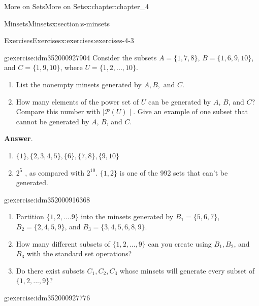 \documentclass[oneside,10pt,]{book}
\newcommand{\blocktitlefont}{\relax}
\begin{document}
\begin{chapterptx}{More on Sets}{}{More on Sets}{}{}{x:chapter:chapter_4}
\begin{sectionptx}{Minsets}{}{Minsets}{}{}{x:section:s-minsets}
%
%
\typeout{************************************************}
\typeout{************************************************}
%
\begin{exercises-subsection}{Exercises}{}{Exercises}{}{}{x:exercises:exercises-4-3}
\begin{divisionexercise}{1}{}{}{g:exercise:idm352000927904}%
Consider the subsets \(A = \{1, 7, 8\}\), \(B = \{1, 6, 9, 10\}\), and \(C = \{1, 9, 10\}\), where \(U = \{1,2, . . . , 10\}\).%
\par
%
\begin{enumerate}[label=(\alph*)]
\item{}List the nonempty minsets generated by \(A, B, \textrm{ and } C\).%
\item{}How many elements of the power set of \(U\) can be generated by \(A\), \(B\), and \(C\)? Compare this number with \(\mid\mathcal{P}(U)\mid\).  Give an example of one subset that cannot be generated by \(A\), \(B\), and \(C\).%
\end{enumerate}
%
\par\smallskip%
\noindent\textbf{\blocktitlefont Answer}.\hypertarget{g:answer:idm352000927536}{}\quad{}%
\begin{enumerate}[label=(\alph*)]
\item{}\(\displaystyle \{1\}, \{2, 3, 4, 5\}, \{6\}, \{7, 8\}, \{9, 10\}\)%
\item{}\(2^5\) , as compared with \(2^{10}\).   \(\{1, 2\}\) is one of the 992 sets that can't be generated.%
\end{enumerate}
%
\end{divisionexercise}%
\begin{divisionexercise}{2}{}{}{g:exercise:idm352000916368}%
%
\begin{enumerate}[label=(\alph*)]
\item{}Partition \(\{1, 2, .... 9\}\) into the minsets generated by \(B_1= \{5, 6,7\}\), \(B_2 = \{2, 4, 5, 9\}\), and \(B_3 = \{3, 4, 5, 6, 8, 9\}\).%
\item{}How many different subsets of \(\{1, 2, . . . ,9\}\) can you create using \(B_1, B_2\), and \(B_3\) with the standard set operations?%
\item{}Do there exist subsets \(C_1, C_2, C_3\) whose minsets will generate every subset of \(\{1,2, . . . ,9\}\)?%
\end{enumerate}
%
\end{divisionexercise}%
\begin{divisionexercise}{3}{}{}{g:exercise:idm352000927776}%

\end{divisionexercise}
\end{exercises-subsection}
\end{sectionptx}
\end{chapterptx}
\end{document}
